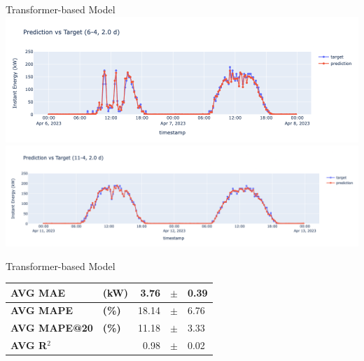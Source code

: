 \begin{frame}{Transformer-based Model}
\centering
\includegraphics[width=\textwidth]{sections/5_eval/imgs/trans/trans2dbuco1.png}
\includegraphics[width=\textwidth]{sections/5_eval/imgs/trans/gabeval2giornibucobello.png}

\end{frame}

\begin{frame}{Transformer-based Model}

    \begin{table}[]
        \centering
        \begin{tabular}{ll|rcl}
            \textbf{AVG MAE}&\textbf{(kW)} & 3.76 &$\pm$ &0.39 \\
            \hline
            \textbf{AVG MAPE} &\textbf{(\%)} & 18.14 &$\pm$ &6.76 \\
            \hline
            \textbf{AVG MAPE@20}&\textbf{(\%)} & 11.18 &$\pm$ &3.33 \\
            \hline
            \textbf{AVG R$^2$} && 0.98 &$\pm$ &0.02
        \end{tabular}
    \end{table}
    
\end{frame}


